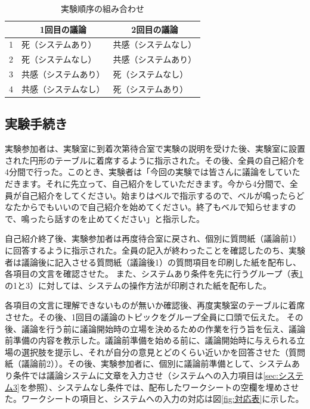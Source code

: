 \documentclass[11pt, a4paper]{jreport} %
\begin{document}
\begin{table}[]
\caption{実験順序の組み合わせ}
\centering
\label{tab:順序}
\begin{tabular}{@{}lll@{}}
\toprule
  & \multicolumn{1}{c}{1回目の議論} & \multicolumn{1}{c}{2回目の議論} \\ \midrule
1 & 死（システムあり）                  & 共感（システムなし）                 \\
2 & 死（システムなし）                  & 共感（システムあり）                 \\
3 & 共感（システムあり）                 & 死（システムなし）                  \\
4 & 共感（システムなし）                 & 死（システムあり）                  \\ \bottomrule
\end{tabular}
\end{table}


\subsection{実験手続き}
実験参加者は、実験室に到着次第待合室で実験の説明を受けた後、実験室に設置された円形のテーブルに着席するように指示された。その後、全員の自己紹介を4分間で行った。このとき、実験者は「今回の実験では皆さんに議論をしていただきます。それに先立って、自己紹介をしていただきます。今から4分間で、全員が自己紹介をしてください。始まりはベルで指示するので、ベルが鳴ったらどなたからでもいいので自己紹介を始めてください。終了もベルで知らせますので、鳴ったら話すのを止めてください」と指示した。


自己紹介終了後、実験参加者は再度待合室に戻され、個別に質問紙（議論前1）に回答するように指示された。全員の記入が終わったことを確認したのち、実験者は議論後に記入させる質問紙（議論後1）の質問項目を印刷した紙を配布し、各項目の文言を確認させた。
また、システムあり条件を先に行うグループ（表\ref{tab:順序}の1と3）に対しては、システムの操作方法が印刷された紙を配布した。

各項目の文言に理解できないものが無いか確認後、再度実験室のテーブルに着席させた。その後、1回目の議論のトピックをグループ全員に口頭で伝えた。
その後、議論を行う前に議論開始時の立場を決めるための作業を行う旨を伝え、議論前準備の内容を教示した。議論前準備を始める前に、議論開始時に与えられる立場の選択肢を提示し、それが自分の意見とどのくらい近いかを回答させた（質問紙（議論前2））。その後、実験参加者に、個別に議論前準備として、システムあり条件では議論システムに文章を入力させ（システムへの入力項目は\ref{sec:システム3}を参照）、システムなし条件では、配布したワークシートの空欄を埋めさせた。ワークシートの項目と、システムへの入力の対応は図\ref{fig:対応表}に示した。
\end{document}
